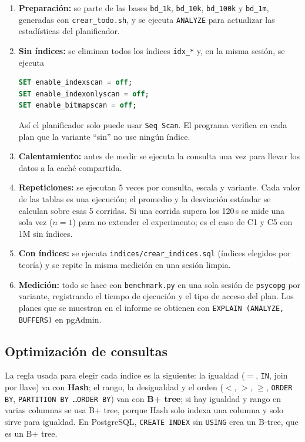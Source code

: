 \begin{enumerate}
    \item \textbf{Preparación:} se parte de las bases \texttt{bd\_1k},
    \texttt{bd\_10k}, \texttt{bd\_100k} y \texttt{bd\_1m}, generadas con
    \texttt{crear\_todo.sh}, y se ejecuta \texttt{ANALYZE} para actualizar las
    estadísticas del planificador.

    \item \textbf{Sin índices:} se eliminan todos los índices \texttt{idx\_*} y,
    en la misma sesión, se ejecuta
    \begin{lstlisting}[language=SQL]
SET enable_indexscan = off;
SET enable_indexonlyscan = off;
SET enable_bitmapscan = off;
    \end{lstlisting}
    Así el planificador solo puede usar \texttt{Seq Scan}. El programa verifica
    en cada plan que la variante ``sin'' no use ningún índice.

    \item \textbf{Calentamiento:} antes de medir se ejecuta la consulta una vez
    para llevar los datos a la caché compartida.

    \item \textbf{Repeticiones:} se ejecutan 5 veces por consulta, escala y
    variante. Cada valor de las tablas es una ejecución; el promedio y la
    desviación estándar se calculan sobre esas 5 corridas. Si una corrida supera
    los 120\,s se mide una sola vez ($n=1$) para no extender el experimento; es
    el caso de C1 y C5 con 1M sin índices.

    \item \textbf{Con índices:} se ejecuta \texttt{indices/crear\_indices.sql}
    (índices elegidos por teoría) y se repite la misma medición en una sesión
    limpia.

    \item \textbf{Medición:} todo se hace con \texttt{benchmark.py} en una sola
    sesión de \texttt{psycopg} por variante, registrando el tiempo de ejecución
    y el tipo de acceso del plan. Los planes que se muestran en el informe se
    obtienen con \texttt{EXPLAIN (ANALYZE, BUFFERS)} en pgAdmin.
\end{enumerate}

\subsection{Optimización de consultas}

La regla usada para elegir cada índice es la siguiente: la igualdad
($=$, \texttt{IN}, join por llave) va con \textbf{Hash}; el rango, la
desigualdad y el orden ($<$, $>$, $\ge$, \texttt{ORDER BY},
\texttt{PARTITION BY \dots ORDER BY}) van con \textbf{B+ tree}; si hay igualdad
y rango en varias columnas se usa B+ tree, porque Hash solo indexa una columna y
solo sirve para igualdad. En PostgreSQL, \texttt{CREATE INDEX} sin
\texttt{USING} crea un B-tree, que es un B+ tree.

